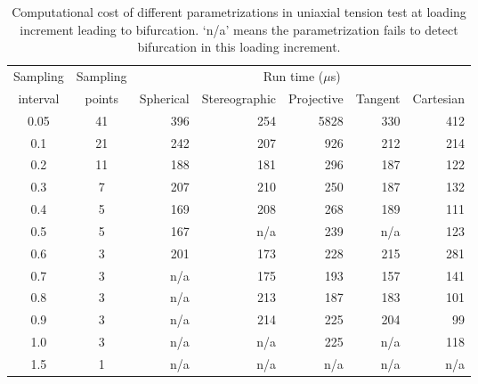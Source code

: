 \documentclass[12pt]{article}
\numberwithin{equation}{section}
\begin{document}
\begin{table}[H]
  \begin{center}
    \begin{tabular}{c c | r r r r r}
      \toprule
      Sampling   & Sampling &   \multicolumn{5}{c}{Run time ($\mu$s)}	\\   
      interval     & points     &  Spherical    &   Stereographic  &   Projective  &   Tangent   & Cartesian  \\
      \midrule         
      0.05      &      41     &      396     &    254       &       5828       &       330        &      412           \\
      0.1        &      21     &      242     &    207       &       926         &       212        &      214           \\
      0.2        &      11     &      188     &    181       &       296         &       187        &      122           \\
      0.3        &      7       &      207     &    210       &       250         &       187        &      132           \\
      0.4        &      5       &      169     &    208       &       268         &       189        &      111           \\       
      0.5        &      5       &	  167     &    n/a        &       239         &       n/a         &      123           \\
      0.6        &      3       &	  201     &    173       &       228         &       215        &      281           \\
      0.7        &      3       &	  n/a      &    175 	     &       193         &       157        &      141           \\
      0.8        &      3       &      n/a      &    213       &       187         &       183        &       101          \\	      
      0.9        &      3       &	  n/a      &    214       &       225         &       204        &       99            \\	
      1.0        &      3       &      n/a      &    n/a	     &       225         &       n/a         &       118          \\	
      1.5        &      1       &	  n/a      &    n/a	     &       n/a          &       n/a         &       n/a           \\	       
      \bottomrule
    \end{tabular}
    \caption{Computational cost of different parametrizations in 
    uniaxial tension test at loading increment leading to bifurcation. 
    `n/a' means the parametrization fails to detect bifurcation in 
    this loading increment.}
    \label{tab:aniso_uniaxial_runtime}
  \end{center}
\end{table}
\end{document}
